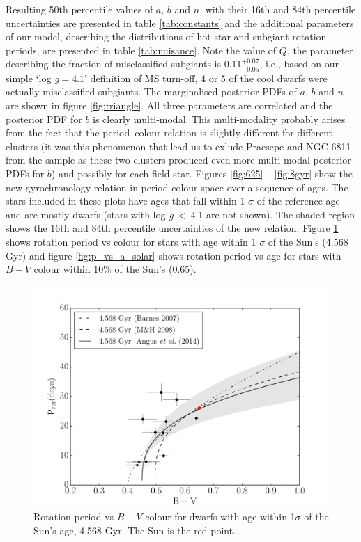 \documentclass[useAMS, usenatbib]{mn2e}
\newcommand{\logg}{log \emph{g}}
\newcommand{\Q}{0.11}
\newcommand{\Qerrp}{0.07}
\newcommand{\Qerrm}{0.05}
\begin{document}
Resulting 50th percentile values of $a$, $b$ and $n$, with their 16th and 84th
percentile uncertainties are presented in table \ref{tab:constants} and the
additional parameters of our model, describing the distributions of hot star
and subgiant rotation periods, are presented in table \ref{tab:nuisance}.
Note the value of $Q$, the parameter describing the fraction of misclassified
subgiants is $\Q^{+\Qerrp}_{-\Qerrm}$, i.e., based on our simple `\logg$=4.1$'
definition of MS turn-off, 4 or 5 of the cool dwarfs were actually
misclassified subgiants.
The marginalised posterior PDFs of $a$, $b$ and $n$ are shown in figure
\ref{fig:triangle}.
All three parameters are correlated and the posterior PDF for $b$ is clearly
multi-modal.
This multi-modality probably arises from the fact that the period--colour
relation is slightly different for different clusters (it was this phenomenon
that lead us to exlude Praesepe and NGC 6811 from the sample as these two
clusters produced even more multi-modal posterior PDFs for $b$) and possibly
for each field star.
Figures \ref{fig:625} -- \ref{fig:8gyr} show the new gyrochronology relation
in period-colour space over a sequence of ages.
The stars included in these plots have ages that fall within 1 $\sigma$ of the
reference age and are mostly dwarfs (stars with \logg$~<~$4.1 are not shown).
The shaded region shows the 16th and 84th percentile uncertainties of the new
relation.
Figure \ref{fig:p_vs_bv_solar} shows rotation period vs colour for stars with
age within 1 $\sigma$ of the Sun's (4.568 Gyr) and figure
\ref{fig:p_vs_a_solar} shows rotation period vs age for stars with $B-V$
colour within 10\% of the Sun's (0.65).

\begin{figure}
\begin{center}
\includegraphics[width=6in, clip=true, trim=0 0 0.5in 0]{p_vs_bv_solar.pdf}
\caption{Rotation period vs $B-V$ colour for dwarfs with age within 1$\sigma$ of the Sun's age, 4.568 Gyr. The Sun is the red point.
\label{fig:p_vs_bv_solar}}
\end{center}
\end{figure}
\end{document}
